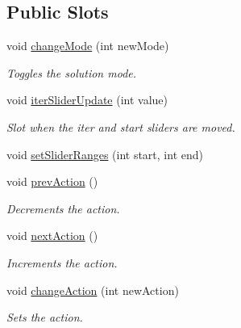 \subsection*{Public Slots}
\begin{DoxyCompactItemize}
\item 
\mbox{\label{classSGPlotController_aded7c120acb427ad77d4e57ce79f4e0d}} 
void \hyperlink{classSGPlotController_aded7c120acb427ad77d4e57ce79f4e0d}{change\+Mode} (int new\+Mode)
\begin{DoxyCompactList}\small\item\em Toggles the solution mode. \end{DoxyCompactList}\item 
\mbox{\label{classSGPlotController_ae34ccf38225310038155d3f815e98793}} 
void \hyperlink{classSGPlotController_ae34ccf38225310038155d3f815e98793}{iter\+Slider\+Update} (int value)
\begin{DoxyCompactList}\small\item\em Slot when the iter and start sliders are moved. \end{DoxyCompactList}\item 
void \hyperlink{classSGPlotController_a30efaeb2ec5cb752d6354f05447b287a}{set\+Slider\+Ranges} (int start, int end)
\item 
\mbox{\label{classSGPlotController_a353dbab68b537e6443e7141a3e20f383}} 
void \hyperlink{classSGPlotController_a353dbab68b537e6443e7141a3e20f383}{prev\+Action} ()
\begin{DoxyCompactList}\small\item\em Decrements the action. \end{DoxyCompactList}\item 
\mbox{\label{classSGPlotController_a3ccda5aca5a19194fb5699e62a6307d5}} 
void \hyperlink{classSGPlotController_a3ccda5aca5a19194fb5699e62a6307d5}{next\+Action} ()
\begin{DoxyCompactList}\small\item\em Increments the action. \end{DoxyCompactList}\item 
\mbox{\label{classSGPlotController_a4aab087b3ee5e3da82652510bba54048}} 
void \hyperlink{classSGPlotController_a4aab087b3ee5e3da82652510bba54048}{change\+Action} (int new\+Action)
\begin{DoxyCompactList}\small\item\em Sets the action. \end{DoxyCompactList}\end{DoxyCompactItemize}
